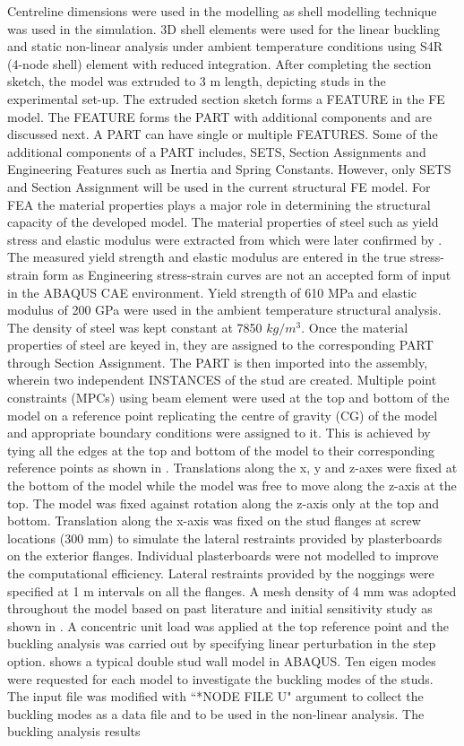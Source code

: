 Centreline dimensions were used in the modelling as shell modelling technique was used in the simulation. 3D shell elements were used for the linear buckling and static non-linear analysis under ambient temperature conditions using S4R (4-node shell) element with reduced integration. After completing the section sketch, the model was extruded to 3 m length, depicting studs in the experimental set-up. The extruded section sketch forms a FEATURE in the FE model. The FEATURE forms the PART with additional components and are discussed next. A PART can have single or multiple FEATURES. Some of the additional components of a PART includes, SETS, Section Assignments and Engineering Features such as Inertia and Spring Constants. However, only SETS and Section Assignment will be used in the current structural FE model. For FEA the material properties plays a major role in determining the structural capacity of the developed model. The material properties of steel such as yield stress and elastic modulus were extracted from \citet{Kankanamge2011} which were later confirmed by \citet{Rokilan2019}. The measured yield strength and elastic modulus are entered in the true stress-strain form as Engineering stress-strain curves are not an accepted form of input in the ABAQUS CAE environment. Yield strength of 610 MPa and elastic modulus of 200 GPa were used in the ambient temperature structural analysis. The density of steel was kept constant at 7850 $kg/m^3$. Once the material properties of steel are keyed in, they are assigned to the corresponding PART through Section Assignment. The PART is then imported into the assembly, wherein two independent INSTANCES of the stud are created. Multiple point constraints (MPCs) using beam element were used at the top and bottom of the model on a reference point replicating the centre of gravity (CG) of the model and appropriate boundary conditions were assigned to it. This is achieved by tying all the edges at the top and bottom of the model to their corresponding reference points as shown in . Translations along the x, y and z-axes were fixed at the bottom of the model while the model was free to move along the z-axis at the top. The model was fixed against rotation along the z-axis only at the top and bottom. Translation along the x-axis was fixed on the stud flanges at screw locations (300 mm) to simulate the lateral restraints provided by plasterboards on the exterior flanges. Individual plasterboards were not modelled to improve the computational efficiency. Lateral restraints provided by the noggings were specified at 1 m intervals on all the flanges. A mesh density of 4 mm was adopted throughout the model based on past literature and initial sensitivity study as shown in . A concentric unit load was applied at the top reference point and the buckling analysis was carried out by specifying linear perturbation in the step option.  shows a typical double stud wall model in ABAQUS. Ten eigen modes were requested for each model to investigate the buckling modes of the studs. The input file was modified with ``*NODE FILE U" argument to collect the buckling modes as a data file and to be used in the non-linear analysis. The buckling analysis results 